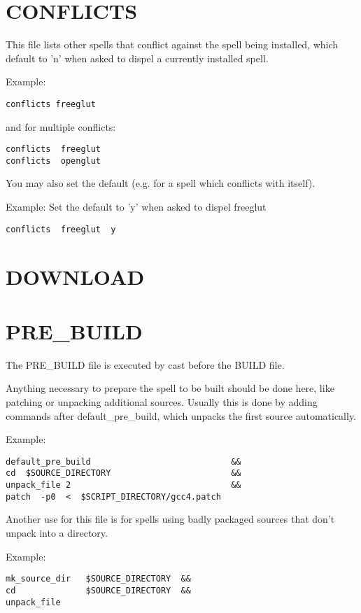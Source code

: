 \documentclass[a4paper,10pt]{book}
\begin{document}
\section{CONFLICTS}
This file lists other spells that conflict against the spell being installed,
which default to 'n' when asked to dispel a currently installed spell.

Example:
\begin{verbatim}
conflicts freeglut
\end{verbatim}

and for multiple conflicts:
\begin{verbatim}
conflicts  freeglut
conflicts  openglut
\end{verbatim}

You may also set the default (e.g. for a spell which conflicts with itself).

Example: Set the default to 'y' when asked to dispel freeglut
\begin{verbatim}
conflicts  freeglut  y
\end{verbatim}

\section{DOWNLOAD}

\section{PRE\_BUILD}
The PRE\_BUILD file is executed by cast before the BUILD file.

Anything necessary to prepare the spell to be built should be done here, like
patching or unpacking additional sources. Usually this is done by adding
commands after default\_pre\_build, which unpacks the first source
automatically.

Example:
\begin{verbatim}
default_pre_build                            &&
cd  $SOURCE_DIRECTORY                        &&
unpack_file 2                                &&
patch  -p0  <  $SCRIPT_DIRECTORY/gcc4.patch
\end{verbatim}

Another use for this file is for spells using badly packaged sources that don't
unpack into a directory.

Example:
\begin{verbatim}
mk_source_dir   $SOURCE_DIRECTORY  &&
cd              $SOURCE_DIRECTORY  &&
unpack_file
\end{verbatim}
\end{document}
